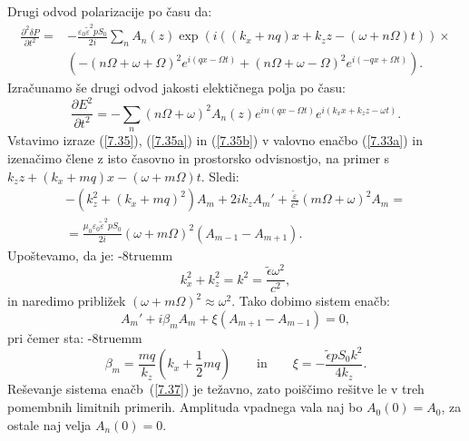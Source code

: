 Drugi odvod 
polarizacije po času da:
\begin{equation}
\begin{split}
\frac{\partial^2 \delta P}{\partial t^2} =&-\frac{\varepsilon_0 \tilde{\varepsilon}^2pS_0}{2i} 
\sum_{n} A_n(z) \exp\left(i((k_x+nq)x+k_{z}z-(\omega+n\Omega)t)\right) \times \\ &\left(
-(n\Omega+\omega+\Omega)^2e^{i(qx-\Omega t)} + (n\Omega+\omega-\Omega)^2e^{i(-qx+\Omega t)} \right)\!\!.
\label{7.35a}
\end{split}
\end{equation}
Izračunamo še drugi odvod jakosti elektičnega polja po času: 
\begin{equation}
\frac{\partial E^{2}}{\partial t^{2}} = - \sum_{n}(n\Omega + \omega)^2 
A_{n}(z)e^{in(qx-\Omega t)}e^{i(k_{x}x+k_{z}z-\omega t)}.
\label{7.35b}
\end{equation}
Vstavimo izraze (\ref{7.35}), (\ref{7.35a}) in (\ref{7.35b}) v valovno enačbo (\ref{7.33a})
in izenačimo člene z isto časovno in prostorsko odvisnostjo, na primer
s $k_z z+(k_x+mq)x-(\omega+m\Omega)t$. Sledi:
\begin{equation}
\begin{split}
-\left(k_{z}^{2}+(k_{x}+mq)^{2}\right)A_{m}+2ik_{z}A_{m}' + \frac{\tilde{\varepsilon}}{c^2}(m\Omega+\omega)^2A_m
=\\ =\frac{\mu_0\varepsilon_0\tilde{\varepsilon}^2pS_0}{2i}(\omega+m\Omega)^{2}(A_{m-1}-A_{m+1}).
\end{split}
\end{equation}
Upoštevamo, da je:
\vglue-8truemm
\begin{equation} 
k_{x}^{2}+k_{z}^{2}=k^{2}=\frac{\tilde{\epsilon}\omega^2}{c^{2}},
\end{equation}
in naredimo približek $(\omega +m\Omega)^2 \approx \omega^2$.
Tako dobimo sistem enačb:
\begin{equation}
A_{m}'+i\beta_{m}A_{m}+\xi(A_{m+1}-A_{m-1})=0,
\label{7.37}
\end{equation}
pri čemer sta:
\vglue-8truemm
\begin{equation}
\beta_{m}=\frac{mq}{k_{z}}(k_{x}+\frac{1}{2}mq) \qquad \mathrm{in} \qquad 
\xi=-\frac{\tilde{\epsilon} pS_0k^2}{4k_z}.
\label{7.38}
\end{equation}
Reševanje sistema enačb~(\ref{7.37}) je težavno, zato poiščimo rešitve le v treh
pomembnih limitnih primerih. Amplituda vpadnega vala naj bo $A_{0}(0)=A_{0}$, 
za ostale naj velja $A_{n}(0)=0$.

